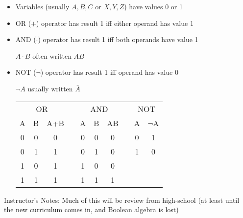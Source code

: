 \begin{frame}[fragile]
\begin{itemize}
	\item Variables (usually $A, B, C$ or $X, Y, Z$) have values 0 or 1
	\item OR ($+$) operator has result 1 iff either operand has value 1
	\item AND ($\cdot$) operator has result 1 iff both operands have value 1
	
		$A\cdot B$ often written $AB$
	\item NOT ($\lnot$) operator has result 1 iff operand has
		value 0

		$\lnot A$ usually written $\bar A$

	\begin{center}
	\begin{tabular}{|c|c|c|c|c|c|c|c|c|c|}\cline{1-3}\cline{5-7}\cline{9-10} 
	\multicolumn{3}{|c|}{OR}& &\multicolumn{3}{|c|}{AND}& &\multicolumn{2}{|c|}{NOT}\\\cline{1-3}\cline{5-7}\cline{9-10}
	A & B & A+B & & A & B & AB & & A & $\lnot$A \\\cline{1-3}\cline{5-7}\cline{9-10}
	0 & 0 & 0   & & 0 & 0 & 0  & & 0 & 1 \\\cline{1-3}\cline{5-7}\cline{9-10}
	0 & 1 & 1   & & 0 & 1 & 0  & & 1 & 0 \\\cline{1-3}\cline{5-7}\cline{9-10}
	1 & 0 & 1   & & 1 & 0 & 0 \\\cline{1-3}\cline{5-7}
	1 & 1 & 1   & & 1 & 1 & 1 \\\cline{1-3}\cline{5-7}
	\end{tabular}
	\end{center}
\end{itemize}
\end{frame}
\BNotes\ifnum{}
\begin{frame}[fragile]
Instructor's Notes:
Much of this will be review from high-school (at least until the
new curriculum comes in, and Boolean algebra is lost)
\end{frame}
\fi\ENotes


